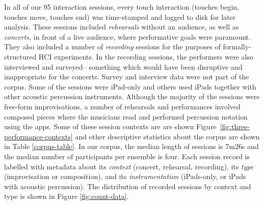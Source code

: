 \documentclass{sigchi}
\begin{document}
In all of our 95 interaction sessions, every touch interaction 
(touches begin, touches move, touches end) was time-stamped and
logged to disk for later analysis. These sessions included {\em rehearsals} without an
audience, as well as {\em concerts}, in front of a live audience, where 
performative goals were paramount. They also included a number of {\em
  recording} sessions
for the purposes of formally-structured HCI experiments. In the recording
sessions, the performers were also interviewed and surveyed-- something which would have 
been disruptive and inappropriate for the concerts. Survey and interview data were not part of the
corpus. 
Some of the sessions were
iPad-only and others used iPads together with other acoustic
percussion instruments. Although the majority of the sessions were
free-form improvisations, a number of rehearsals and performances
involved composed pieces where the musicians read and performed
percussion notation using the apps.
Some of these session contexts are are shown
Figure~\ref{fig:three-performance-contexts} and other descriptive
statistics about the corpus are shown in Table \ref{corpus-table}.
In our corpus, the median length of sessions is 7m26s and the median
number of participants per ensemble is four. Each session record is
labelled with metadata about its \emph{context} (concert,
rehearsal, recording), its \emph{type} (improvisation or composition),
and its \emph{instrumentation} (iPads-only, or iPads with acoustic
percussion). The distribution of recorded sessions by context and type
is shown in Figure \ref{fig:count-data}.


\end{document}
